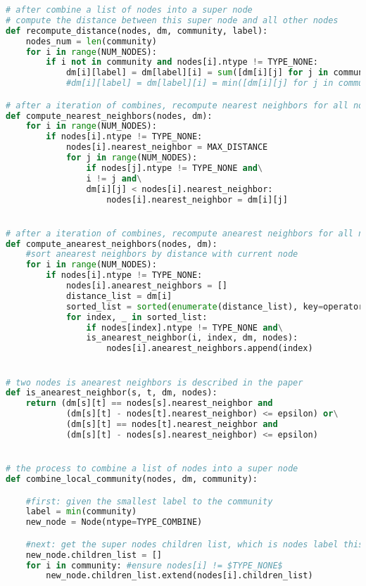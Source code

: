 \begin{lstlisting}[language={python}, caption={DSHRINK算法}, label=code:dshrink]
# after combine a list of nodes into a super node
# compute the distance between this super node and all other nodes
def recompute_distance(nodes, dm, community, label):
    nodes_num = len(community)
    for i in range(NUM_NODES):
        if i not in community and nodes[i].ntype != TYPE_NONE:
            dm[i][label] = dm[label][i] = sum([dm[i][j] for j in community]) / nodes_num #use average distance
            #dm[i][label] = dm[label][i] = min([dm[i][j] for j in community])

# after a iteration of combines, recompute nearest neighbors for all nodes of type not none
def compute_nearest_neighbors(nodes, dm):
    for i in range(NUM_NODES):
        if nodes[i].ntype != TYPE_NONE:
            nodes[i].nearest_neighbor = MAX_DISTANCE
            for j in range(NUM_NODES):
                if nodes[j].ntype != TYPE_NONE and\
                i != j and\
                dm[i][j] < nodes[i].nearest_neighbor:
                    nodes[i].nearest_neighbor = dm[i][j]


# after a iteration of combines, recompute anearest neighbors for all nodes of type not none
def compute_anearest_neighbors(nodes, dm):
    #sort anearest neighbors by distance with current node
    for i in range(NUM_NODES):
        if nodes[i].ntype != TYPE_NONE:
            nodes[i].anearest_neighbors = []
            distance_list = dm[i]
            sorted_list = sorted(enumerate(distance_list), key=operator.itemgetter(1))
            for index, _ in sorted_list:
                if nodes[index].ntype != TYPE_NONE and\
                is_anearest_neighbor(i, index, dm, nodes):
                    nodes[i].anearest_neighbors.append(index)


# two nodes is anearest neighbors is described in the paper
def is_anearest_neighbor(s, t, dm, nodes):
    return (dm[s][t] == nodes[s].nearest_neighbor and
            (dm[s][t] - nodes[t].nearest_neighbor) <= epsilon) or\
            (dm[s][t] == nodes[t].nearest_neighbor and
            (dm[s][t] - nodes[s].nearest_neighbor) <= epsilon)


# the process to combine a list of nodes into a super node
def combine_local_community(nodes, dm, community):

    #first: given the smallest label to the community
    label = min(community)
    new_node = Node(ntype=TYPE_COMBINE)

    #next: get the super nodes children list, which is nodes label this node contains
    new_node.children_list = []
    for i in community: #ensure nodes[i] != $TYPE_NONE$
        new_node.children_list.extend(nodes[i].children_list)


\end{lstlisting}
